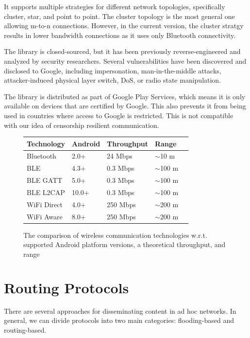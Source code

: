 \documentclass[conference,compsoc]{IEEEtran}
\begin{document}
It supports multiple strategies for different network topologies, specifically cluster, star, and point to point. The cluster topology is the most general one allowing m-to-n connections. However, in the current version, the cluster stratgy results in lower bandwidth connections as it uses only Bluetooth connectivity.

The library is closed-sourced, but it has been previously reverse-engineered and analyzed by security researchers. Several vulnerabilities have been discovered and disclosed to Google, including impersonation, man-in-the-middle attacks, attacker-induced physical layer switch, DoS, or radio state manipulation. \cite{nearbytr}

The library is distributed as part of Google Play Services, which means it is only available on devices that are certified by Google. This also prevents it from being used in countries where access to Google is restricted. This is not compatible with our idea of censorship resilient communication.

\begin{figure}  
  \centering
  \begin{tabular}{ | l | l | l | l | l | }
    \hline
    Technology & Android & Throughput & Range \\
    \hline
    Bluetooth & 2.0+ & 24 Mbps & $\sim$10 m \\
    BLE & 4.3+ & 0.3 Mbps & $\sim$100 m \\
    BLE GATT & 5.0+ & 0.3 Mbps & $\sim$100 m \\
    BLE L2CAP & 10.0+ & 0.3 Mbps & $\sim$100 m \\
    WiFi Direct & 4.0+ & 250 Mbps & $\sim$200 m \\
    WiFi Aware & 8.0+ & 250 Mbps & $\sim$200 m \\
    \hline
  \end{tabular}
  \caption{The comparison of wireless communication technologies w.r.t. supported Android platform versions, a theoretical throughput, and range}
\end{figure}

\section{Routing Protocols}


There are several approaches for disseminating content in ad hoc networks. In general, we can divide protocols into two main categories: flooding-based and routing-based.
\end{document}
